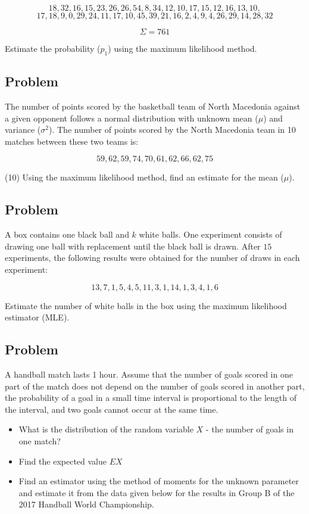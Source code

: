 \documentclass[a4paper, 12pt]{article}
\begin{document}
\[
18, 32, 16, 15, 23, 26, 26, 54, 8, 34, 12, 10, 17, 15, 12, 16, 13, 10, 
\]
\[
  17, 18, 9, 0, 29, 24, 11, 17, 10, 45, 39, 21, 16, 2, 4, 9, 4, 26, 29, 14, 28, 32
\]

\[\Sigma = 761\]

Estimate the probability ($p_1$) using the maximum likelihood method.

\subsection{Problem}
The number of points scored by the basketball team of North Macedonia against a given opponent follows a normal distribution with unknown mean ($\mu$) and variance ($\sigma^2$). The number of points scored by the North Macedonia team in 10 matches between these two teams is:

\[
59, 62, 59, 74, 70, 61, 62, 66, 62, 75
\]

(10) Using the maximum likelihood method, find an estimate for the mean ($\mu$).


\subsection{Problem}
A box contains one black ball and $k$ white balls. One experiment consists of drawing one ball with replacement until the black ball is drawn. After $15$ experiments, the following results were obtained for the number of draws in each experiment:

\[
13, 7, 1, 5, 4, 5, 11, 3, 1, 14, 1, 3, 4, 1, 6
\]

Estimate the number of white balls in the box using the maximum likelihood estimator (MLE).


\subsection{Problem}

A handball match lasts 1 hour. Assume that the number of goals scored in one part of the match does not depend on the number of goals scored in another part, the probability of a goal in a small time interval is proportional to the length of the interval, and two goals cannot occur at the same time.

\begin{itemize}
  \item [a)] What is the distribution of the random variable $X$ - the number of goals in one match?
  \item [b)] Find the expected value $EX$
  \item [c)] Find an estimator using the method of moments for the unknown parameter and estimate it from the data given below for the results in Group B of the 2017 Handball World Championship.
\end{itemize}
\end{document}
